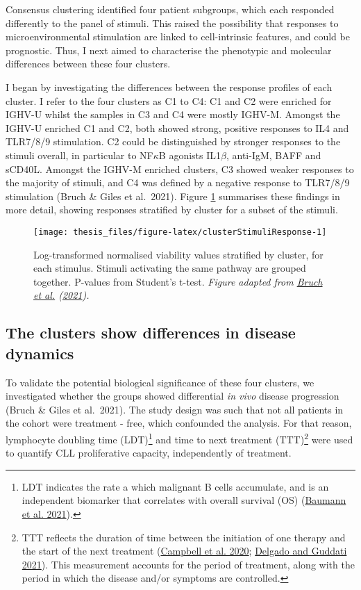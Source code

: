 \documentclass[11pt, a4paper, twosided]{book}
\begin{document}
Consensus clustering identified four patient subgroups, which each responded differently to the panel of stimuli. This raised the possibility that responses to microenvironmental stimulation are linked to cell-intrinsic features, and could be prognostic. Thus, I next aimed to characterise the phenotypic and molecular differences between these four clusters.

I began by investigating the differences between the response profiles of each cluster. I refer to the four clusters as C1 to C4: C1 and C2 were enriched for IGHV-U whilst the samples in C3 and C4 were mostly IGHV-M. Amongst the IGHV-U enriched C1 and C2, both showed strong, positive responses to IL4 and TLR7/8/9 stimulation. C2 could be distinguished by stronger responses to the stimuli overall, in particular to NF\(\kappa\)B agonists IL1\(\beta\), anti-IgM, BAFF and sCD40L. Amongst the IGHV-M enriched clusters, C3 showed weaker responses to the majority of stimuli, and C4 was defined by a negative response to TLR7/8/9 stimulation (Bruch \& Giles et al.~2021). Figure \ref{fig:clusterStimuliResponse} summarises these findings in more detail, showing responses stratified by cluster for a subset of the stimuli.


\begin{figure}

{\centering \texttt{[image: thesis\_files/figure-latex/clusterStimuliResponse-1]} 

}

\caption{Log-transformed normalised viability values stratified by cluster, for each stimulus. Stimuli activating the same pathway are grouped together. P-values from Student's t-test. \emph{Figure adapted from \protect\hyperlink{ref-Giles2021}{Bruch et al.} (\protect\hyperlink{ref-Giles2021}{2021}). }}\label{fig:clusterStimuliResponse}
\end{figure}
\hypertarget{cluster-survival}{%
\subsection{The clusters show differences in disease dynamics}\label{cluster-survival}}

To validate the potential biological significance of these four clusters, we investigated whether the groups showed differential \emph{in vivo} disease progression (Bruch \& Giles et al.~2021). The study design was such that not all patients in the cohort were treatment - free, which confounded the analysis. For that reason, lymphocyte doubling time (LDT)\footnote{LDT indicates the rate a which malignant B cells accumulate, and is an independent biomarker that correlates with overall survival (OS) (\protect\hyperlink{ref-Baumann2021}{Baumann et al. 2021}).} and time to next treatment (TTT)\footnote{TTT reflects the duration of time between the initiation of one therapy and the start of the next treatment (\protect\hyperlink{ref-Campbell2020}{Campbell et al. 2020}; \protect\hyperlink{ref-Delgado2021}{Delgado and Guddati 2021}). This measurement accounts for the period of treatment, along with the period in which the disease and/or symptoms are controlled.} were used to quantify CLL proliferative capacity, independently of treatment.
\end{document}
